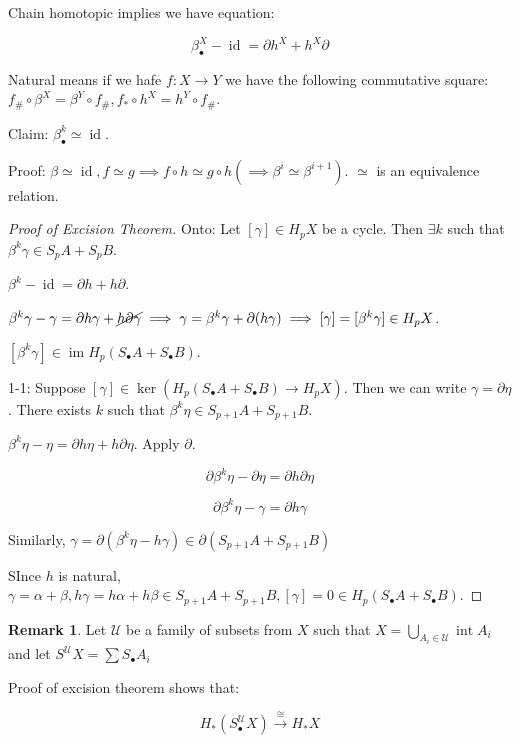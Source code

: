 \documentclass{article}
\theoremstyle{definition}
\newtheorem*{remark}{Remark}
\begin{document}
    Chain homotopic implies we have equation:

    \[
        \beta^X_\bullet -\operatorname{id} = \partial h^X + h^X \partial
    \]

    Natural means if we hafe \(f: X \to Y\) we have the following commutative square: \(f_\# \circ \beta^X = \beta^Y \circ f_\#, f_{\ast} \circ h^X = h^Y \circ f_\#\).

    Claim: \(\beta^k_\bullet \simeq \operatorname{id}\).

    Proof: \(\beta \simeq \operatorname{id},f\simeq g \implies f \circ h \simeq g \circ h (\implies \beta^i \simeq \beta^{i+1})\). \(\simeq\) is an equivalence relation.

    \begin{proof}
        [Proof of Excision Theorem]

        Onto: Let \([\gamma] \in H_p X\) be a cycle. Then \(\exists k\) such that \(\beta^k \gamma \in S_p A + S_p B\).

        \(\beta^k - \operatorname{id} = \partial h + h \partial\).

        \(\beta^k \gamma - \gamma = \partial h \gamma + \cancel{h \partial \gamma} \implies \gamma = \beta^k \gamma + \partial (h \gamma) \implies [\gamma] = [\beta^k \gamma] \in H_p X\).
        
        \([\beta^k \gamma] \in \operatorname{im} H_p(S_\bullet A + S_\bullet B)\).
        
        1-1: Suppose \([\gamma] \in \ker(H_p(S_\bullet A + S_\bullet B) \to H_p X)\). Then we can write \(\gamma = \partial \eta\). There exists \(k\) such that \(\beta^k \eta \in S_{p+1} A + S_{p+1} B\).
        
        \(\beta^k \eta - \eta = \partial h \eta + h \partial \eta\). Apply \(\partial\).
        
        \[
            \partial \beta^k \eta - \partial \eta = \partial h\partial \eta
        \]

        \[
            \partial \beta^k \eta - \gamma = \partial h \gamma
        \]

        Similarly, \(\gamma = \partial (\beta^k \eta - h \gamma) \in \partial (S_{p+1} A + S_{p+1} B)\)
        
        SInce \(h\) is natural, \(\gamma = \alpha + \beta , h \gamma = h \alpha + h \beta \in S_{p+1} A + S_{p+1} B, [\gamma] = 0 \in H_p(S_\bullet A + S_\bullet B)\).
    \end{proof}

    \begin{remark}
        Let \(\mathcal{U}\) be a family of subsets from \(X\) such that \(X = \bigcup_{A_i \in \mathcal{U}} \operatorname{int} A_i\) and let \(S^{\mathcal{U}} X = \sum S_\bullet A_i\)
        
        Proof of excision theorem shows that:

        \[
            H_{\ast} (S^{\mathcal{U}}_\bullet X) \xrightarrow{\cong} H_{\ast} X
        \]
    \end{remark}
\end{document}
